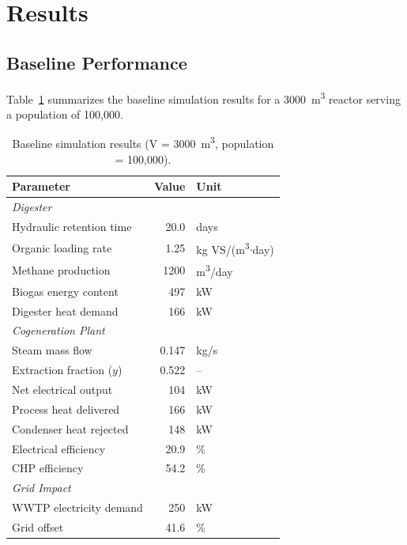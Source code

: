 \documentclass[12pt, letterpaper]{article}
\begin{document}
\section{Results}

\subsection{Baseline Performance}

Table~\ref{tab:baseline} summarizes the baseline simulation results for a \SI{3000}{\cubic\metre} reactor serving a population of 100,000.

\begin{table}[H]
  \centering
  \caption{Baseline simulation results (V = \SI{3000}{\cubic\metre}, population = 100,000).}
  \label{tab:baseline}
  \begin{tabular}{@{}lrl@{}}
    \toprule
    \textbf{Parameter} & \textbf{Value} & \textbf{Unit} \\
    \midrule
    \multicolumn{3}{l}{\textit{Digester}} \\
    Hydraulic retention time & 20.0 & days \\
    Organic loading rate & 1.25 & kg VS/(m\textsuperscript{3}$\cdot$day) \\
    Methane production & 1200 & m\textsuperscript{3}/day \\
    Biogas energy content & 497 & kW \\
    Digester heat demand & 166 & kW \\
    \midrule
    \multicolumn{3}{l}{\textit{Cogeneration Plant}} \\
    Steam mass flow & 0.147 & kg/s \\
    Extraction fraction ($y$) & 0.522 & -- \\
    Net electrical output & 104 & kW \\
    Process heat delivered & 166 & kW \\
    Condenser heat rejected & 148 & kW \\
    Electrical efficiency & 20.9 & \% \\
    CHP efficiency & 54.2 & \% \\
    \midrule
    \multicolumn{3}{l}{\textit{Grid Impact}} \\
    WWTP electricity demand & 250 & kW \\
    Grid offset & 41.6 & \% \\
    \bottomrule
  \end{tabular}
\end{table}
\end{document}
